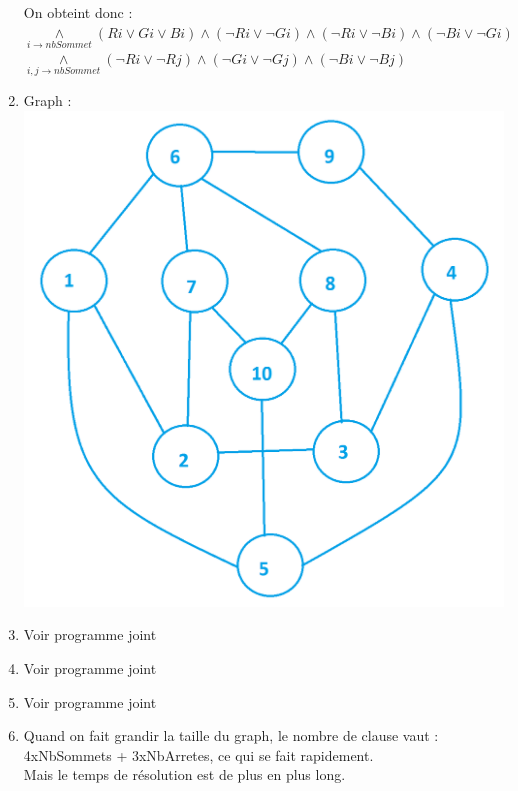 \documentclass[12pt]{report}
\begin{document}
\begin{enumerate}
\noindent On obteint donc : \\
$\underset{i \rightarrow nbSommet}{\land} (Ri \lor Gi \lor Bi) \land (\lnot Ri \lor \lnot Gi) \land (\lnot Ri \lor \lnot Bi) \land (\lnot Bi \lor \lnot Gi)$ \\
$\underset{i,j \rightarrow nbSommet}{\land} (\lnot Ri \lor \lnot Rj) \land (\lnot Gi \lor \lnot Gj) \land (\lnot Bi \lor \lnot Bj) $
\item Graph :\\
\includegraphics[scale=0.5]{./graph.png}\\[1cm]
\item Voir programme joint
\item Voir programme joint
\item Voir programme joint
\item Quand on fait grandir la taille du graph, le nombre de clause vaut : \\4xNbSommets + 3xNbArretes, ce qui se fait rapidement. \\
Mais le temps de résolution est de plus en plus long.
\end{enumerate}
\end{document}
